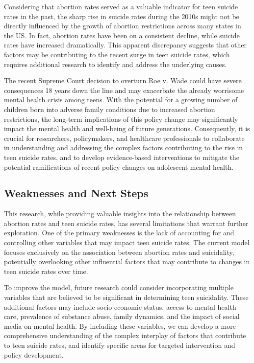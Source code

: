 \documentclass[
  letterpaper,
  DIV=11,
  numbers=noendperiod]{scrartcl}
\begin{document}
Considering that abortion rates served as a valuable indicator for teen
suicide rates in the past, the sharp rise in suicide rates during the
2010s might not be directly influenced by the growth of abortion
restrictions across many states in the US. In fact, abortion rates have
been on a consistent decline, while suicide rates have increased
dramatically. This apparent discrepancy suggests that other factors may
be contributing to the recent surge in teen suicide rates, which
requires additional research to identify and address the underlying
causes.

The recent Supreme Court decision to overturn Roe v. Wade could have
severe consequences 18 years down the line and may exacerbate the
already worrisome mental health crisis among teens. With the potential
for a growing number of children born into adverse family conditions due
to increased abortion restrictions, the long-term implications of this
policy change may significantly impact the mental health and well-being
of future generations. Consequently, it is crucial for researchers,
policymakers, and healthcare professionals to collaborate in
understanding and addressing the complex factors contributing to the
rise in teen suicide rates, and to develop evidence-based interventions
to mitigate the potential ramifications of recent policy changes on
adolescent mental health.

\hypertarget{weaknesses-and-next-steps}{%
\subsection{Weaknesses and Next Steps}\label{weaknesses-and-next-steps}}

This research, while providing valuable insights into the relationship
between abortion rates and teen suicide rates, has several limitations
that warrant further exploration. One of the primary weaknesses is the
lack of accounting for and controlling other variables that may impact
teen suicide rates. The current model focuses exclusively on the
association between abortion rates and suicidality, potentially
overlooking other influential factors that may contribute to changes in
teen suicide rates over time.

To improve the model, future research could consider incorporating
multiple variables that are believed to be significant in determining
teen suicidality. These additional factors may include socio-economic
status, access to mental health care, prevalence of substance abuse,
family dynamics, and the impact of social media on mental health. By
including these variables, we can develop a more comprehensive
understanding of the complex interplay of factors that contribute to
teen suicide rates, and identify specific areas for targeted
intervention and policy development.
\end{document}
